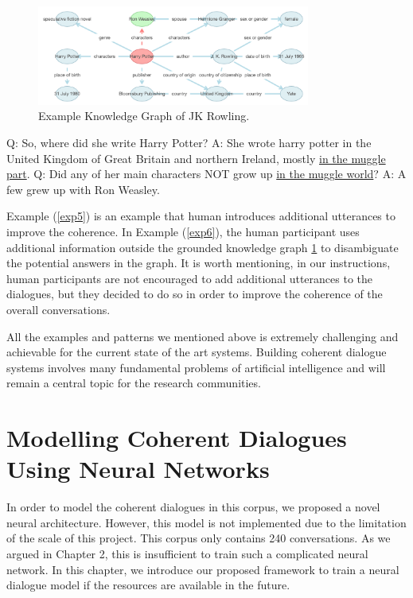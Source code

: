 \documentclass[bsc,frontabs,twoside,singlespacing,parskip,deptreport]{infthesis}     %
\begin{document}
\begin{figure}[h]
    \centering
    \includegraphics[width=0.8\textwidth]{jk.png}
    \caption{Example Knowledge Graph of JK Rowling.}
    \label{fig:jk}
\end{figure}


\begin{exe}
	\ex
	\label{exp6}
		\begin{xlist}
			\ex \label{exp3q1} Q: So, where did she write Harry Potter?
			\ex \label{exp3a1} A: She wrote harry potter in the United Kingdom of Great Britain and northern Ireland, mostly \underline{in the muggle part}.
			\ex \label{exp3q1} Q: Did any of her main characters NOT grow up \underline{in the muggle world}?
			\ex \label{exp3a1} A: A few grew up with Ron Weasley.
	\end{xlist}
\end{exe}


Example (\ref{exp5}) is an example that human introduces additional utterances to improve the coherence. In Example (\ref{exp6}), the human participant uses additional information outside the grounded knowledge graph \ref{fig:jk} to disambiguate the potential answers in the graph. It is worth mentioning, in our instructions, human participants are not encouraged to add additional utterances to the dialogues, but they decided to do so in order to improve the coherence of the overall conversations.

All the examples and patterns we mentioned above is extremely challenging and achievable for the current state of the art systems. Building coherent dialogue systems involves many fundamental problems of artificial intelligence and will remain a central topic for the research communities.



\chapter{Modelling Coherent Dialogues Using Neural Networks}

In order to model the coherent dialogues in this corpus, we proposed a novel neural architecture. However, this model is not implemented due to the limitation of the scale of this project. This corpus only contains 240 conversations. As we argued in Chapter 2, this is insufficient to train such a complicated neural network. In this chapter, we introduce our proposed framework to train a neural dialogue model if the resources are available in the future.
\end{document}
